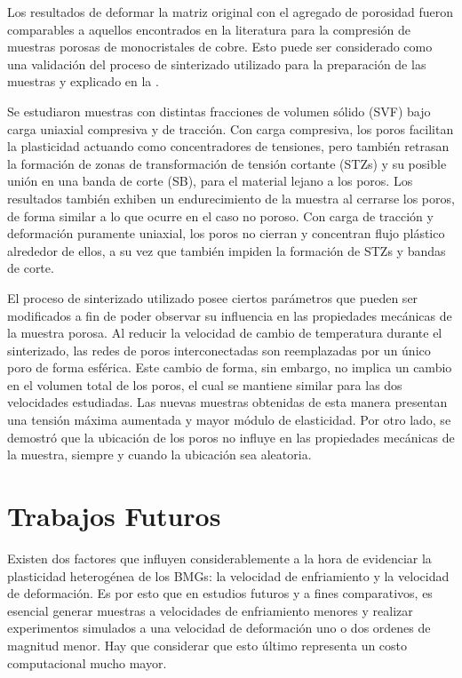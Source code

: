 Los resultados de deformar la matriz original con el agregado de porosidad fueron comparables a aquellos encontrados en la literatura \citep{yuan14} para la compresión de muestras porosas de monocristales de cobre. Esto puede ser considerado como una validación del proceso de sinterizado utilizado para la preparación de las muestras y explicado en la .

Se estudiaron muestras con distintas fracciones de volumen sólido (SVF) bajo carga uniaxial compresiva y de tracción. Con carga compresiva, los poros facilitan la plasticidad actuando como concentradores de tensiones, pero también retrasan la formación de zonas de transformación de tensión cortante (STZs) y su posible unión en una banda de corte (SB), para el material lejano a los poros. Los resultados también exhiben un endurecimiento de la muestra al cerrarse los poros, de forma similar a lo que ocurre en el caso no poroso. Con carga de tracción y deformación puramente uniaxial, los poros no cierran y concentran flujo plástico alrededor de ellos, a su vez que también impiden la formación de STZs y bandas de corte.

El proceso de sinterizado utilizado posee ciertos parámetros que pueden ser modificados a fin de poder observar su influencia en las propiedades mecánicas de la muestra porosa. Al reducir la velocidad de cambio de temperatura durante el sinterizado, las redes de poros interconectadas son reemplazadas por un único poro de forma esférica. Este cambio de forma, sin embargo, no implica un cambio en el volumen total de los poros, el cual se mantiene similar para las dos velocidades estudiadas. Las nuevas muestras obtenidas de esta manera presentan una tensión máxima aumentada y mayor módulo de elasticidad. Por otro lado, se demostró que la ubicación de los poros no influye en las propiedades mecánicas de la muestra, siempre y cuando la ubicación sea aleatoria.


\section{Trabajos Futuros}

Existen dos factores que influyen considerablemente a la hora de evidenciar la plasticidad heterogénea de los BMGs: la velocidad de enfriamiento y la velocidad de deformación. Es por esto que en estudios futuros y a fines comparativos, es esencial generar muestras a velocidades de enfriamiento menores y realizar experimentos simulados a una velocidad de deformación uno o dos ordenes de magnitud menor. Hay que considerar que esto último representa un costo computacional mucho mayor.

